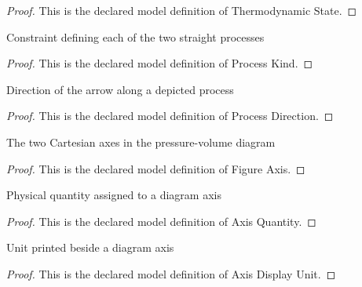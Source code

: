 \begin{proof}
  This is the declared model definition of Thermodynamic State.
\end{proof}
\begin{definition}
  \label{def:physics:phyx-mini-0409:phyxminiproblems-problemphyxmini0409-processkind}
  Constraint defining each of the two straight processes
\end{definition}
\begin{proof}
  This is the declared model definition of Process Kind.
\end{proof}
\begin{definition}
  \label{def:physics:phyx-mini-0409:phyxminiproblems-problemphyxmini0409-processdirection}
  Direction of the arrow along a depicted process
\end{definition}
\begin{proof}
  This is the declared model definition of Process Direction.
\end{proof}
\begin{definition}
  \label{def:physics:phyx-mini-0409:phyxminiproblems-problemphyxmini0409-figureaxis}
  The two Cartesian axes in the pressure-volume diagram
\end{definition}
\begin{proof}
  This is the declared model definition of Figure Axis.
\end{proof}
\begin{definition}
  \label{def:physics:phyx-mini-0409:phyxminiproblems-problemphyxmini0409-axisquantity}
  Physical quantity assigned to a diagram axis
\end{definition}
\begin{proof}
  This is the declared model definition of Axis Quantity.
\end{proof}
\begin{definition}
  \label{def:physics:phyx-mini-0409:phyxminiproblems-problemphyxmini0409-axisdisplayunit}
  Unit printed beside a diagram axis
\end{definition}
\begin{proof}
  This is the declared model definition of Axis Display Unit.
\end{proof}
